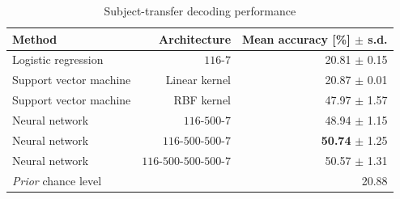 \begin{table}
\label{tab:decoding_accuracy}
  \caption{Subject-transfer decoding performance}
 \centering
 \begin{tabular}{lrr}
  \hline
  \textbf{Method} &\textbf{Architecture} & \textbf{Mean accuracy [\%] $\pm$ s.d.} \\
  \hline
  Logistic regression & $116$-$7$ & 20.81 $\pm$ 0.15 \\
  Support vector machine & Linear kernel & 20.87 $\pm$ 0.01 \\
  Support vector machine & RBF kernel & 47.97 $\pm$ 1.57 \\
  Neural network & $116$-$500$-$7$ & 48.94 $\pm$ 1.15 \\
  Neural network & $116$-$500$-$500$-$7$ & \textbf{50.74} $\pm$ 1.25 \\
  Neural network & $116$-$500$-$500$-$500$-$7$ & 50.57 $\pm$ 1.31 \\
  \hline
 \textit{Prior} chance level & & 20.88 \\ %
  \hline
 \end{tabular}
\end{table}

